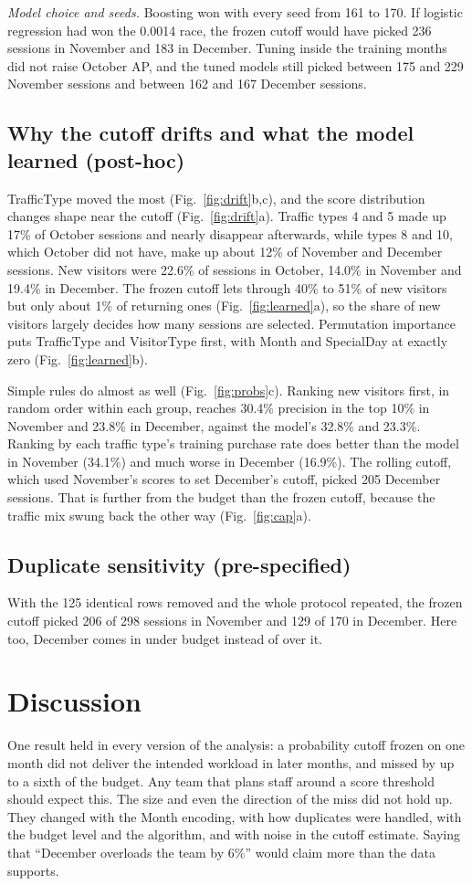 \documentclass[conference]{IEEEtran}
\begin{document}
\emph{Model choice and seeds.} Boosting won with every seed from 161 to 170. If logistic regression had
won the 0.0014 race, the frozen cutoff would have picked 236 sessions in November and 183 in December.
Tuning inside the training months did not raise October AP, and the tuned models still picked between
175 and 229 November sessions and between 162 and 167 December sessions.

\subsection{Why the cutoff drifts and what the model learned (post-hoc)}
TrafficType moved the most (Fig.~\ref{fig:drift}b,c), and the score distribution changes shape near the
cutoff (Fig.~\ref{fig:drift}a). Traffic types 4 and 5 made up 17\% of October sessions and nearly
disappear afterwards, while types 8 and 10, which October did not have, make up about 12\% of November
and December sessions. New visitors were 22.6\% of sessions in October, 14.0\% in November and 19.4\% in
December. The frozen cutoff lets through 40\% to 51\% of new visitors but only about 1\% of returning
ones (Fig.~\ref{fig:learned}a), so the share of new visitors largely decides how many sessions are
selected. Permutation importance puts TrafficType and VisitorType first, with Month and SpecialDay at
exactly zero (Fig.~\ref{fig:learned}b).

Simple rules do almost as well (Fig.~\ref{fig:probs}c). Ranking new visitors first, in random order
within each group, reaches 30.4\% precision in the top 10\% in November and 23.8\% in December, against
the model's 32.8\% and 23.3\%. Ranking by each traffic type's training purchase rate does better than the
model in November (34.1\%) and much worse in December (16.9\%). The rolling cutoff, which used November's
scores to set December's cutoff, picked 205 December sessions. That is further from the budget than the
frozen cutoff, because the traffic mix swung back the other way (Fig.~\ref{fig:cap}a).

\subsection{Duplicate sensitivity (pre-specified)}
With the 125 identical rows removed and the whole protocol repeated, the frozen cutoff picked 206 of 298
sessions in November and 129 of 170 in December. Here too, December comes in under budget instead of
over it.

\section{Discussion}
One result held in every version of the analysis: a probability cutoff frozen on one month did not
deliver the intended workload in later months, and missed by up to a sixth of the budget. Any team
that plans staff around a score threshold should expect this. The size and even the direction of the
miss did not hold up. They changed with the Month encoding, with how duplicates were handled, with the
budget level and the algorithm, and with noise in the cutoff estimate. Saying that ``December overloads
the team by 6\%'' would claim more than the data supports.
\end{document}
